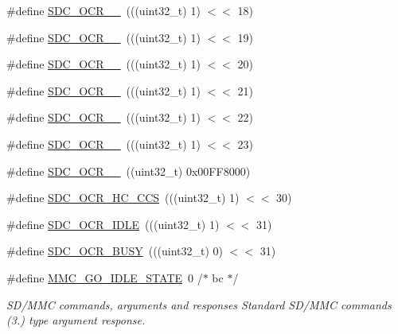 \begin{DoxyCompactItemize}
\item 
\#define \hyperlink{group___c_h_i_p___s_d_m_m_c___definitions_gac8ac6e078fd87273ccf1414c8a973eda}{S\+D\+C\+\_\+\+O\+C\+R\+\_\+\_}~(((uint32\+\_\+t) 1) $<$$<$ 18)
\item 
\#define \hyperlink{group___c_h_i_p___s_d_m_m_c___definitions_gabb0e4fcb66d89b85b06b3a582a3ff7fc}{S\+D\+C\+\_\+\+O\+C\+R\+\_\+\_}~(((uint32\+\_\+t) 1) $<$$<$ 19)
\item 
\#define \hyperlink{group___c_h_i_p___s_d_m_m_c___definitions_ga1fe47ee34f21cef7c1540f0b00862715}{S\+D\+C\+\_\+\+O\+C\+R\+\_\+\_}~(((uint32\+\_\+t) 1) $<$$<$ 20)
\item 
\#define \hyperlink{group___c_h_i_p___s_d_m_m_c___definitions_gaa73ce3a3ac92f7b8af424feb1da0f244}{S\+D\+C\+\_\+\+O\+C\+R\+\_\+\_}~(((uint32\+\_\+t) 1) $<$$<$ 21)
\item 
\#define \hyperlink{group___c_h_i_p___s_d_m_m_c___definitions_ga0c33b5b93a1ac282472eb94658f45682}{S\+D\+C\+\_\+\+O\+C\+R\+\_\+\_}~(((uint32\+\_\+t) 1) $<$$<$ 22)
\item 
\#define \hyperlink{group___c_h_i_p___s_d_m_m_c___definitions_gaecffa97c6d53b409d41f8d81ab52eb59}{S\+D\+C\+\_\+\+O\+C\+R\+\_\+\_}~(((uint32\+\_\+t) 1) $<$$<$ 23)
\item 
\#define \hyperlink{group___c_h_i_p___s_d_m_m_c___definitions_gab6841170140c531e91c8203558e8045b}{S\+D\+C\+\_\+\+O\+C\+R\+\_\+\_}~((uint32\+\_\+t) 0x00\+F\+F8000)
\item 
\#define \hyperlink{group___c_h_i_p___s_d_m_m_c___definitions_ga864b7a2a5b9f0d803ed81711fb881cc8}{S\+D\+C\+\_\+\+O\+C\+R\+\_\+\+H\+C\+\_\+\+C\+CS}~(((uint32\+\_\+t) 1) $<$$<$ 30)
\item 
\#define \hyperlink{group___c_h_i_p___s_d_m_m_c___definitions_gafbd1a2494d5d3895abdd1eec304e6c68}{S\+D\+C\+\_\+\+O\+C\+R\+\_\+\+I\+D\+LE}~(((uint32\+\_\+t) 1) $<$$<$ 31)
\item 
\#define \hyperlink{group___c_h_i_p___s_d_m_m_c___definitions_ga457a04e9259c7c26b56a96c87f628ae2}{S\+D\+C\+\_\+\+O\+C\+R\+\_\+\+B\+U\+SY}~(((uint32\+\_\+t) 0) $<$$<$ 31)
\item 
\#define \hyperlink{group___c_h_i_p___s_d_m_m_c___definitions_ga8cf3224a23122ebda44e49c946adfd04}{M\+M\+C\+\_\+\+G\+O\+\_\+\+I\+D\+L\+E\+\_\+\+S\+T\+A\+TE}~0		/$\ast$ bc                          $\ast$/
\begin{DoxyCompactList}\small\item\em S\+D/\+M\+MC commands, arguments and responses Standard S\+D/\+M\+MC commands (3.) type argument response. \end{DoxyCompactList}\item 
$$
\end{DoxyCompactItemize}
